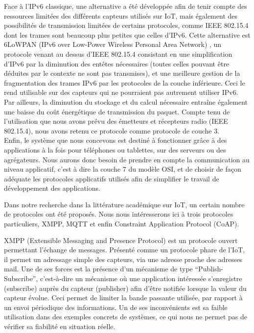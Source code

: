 \documentclass{article}
\begin{document}
Face à l’IPv6 classique, une alternative a été développée afin de tenir compte des ressources limitées des différents capteurs utilisés sur IoT, mais également des possibilités de transmission limitées de certains protocoles, comme IEEE 802.15.4 dont les trames sont beaucoup plus petites que celles d’IPv6. Cette alternative est 6LoWPAN (IPv6 over Low-Power Wireless Personal Area Network) \cite{6LoWPAN}, un protocole venant au dessus d’IEEE 802.15.4 consistant en une simplification d’IPv6 par la diminution des entêtes nécessaires (toutes celles pouvant être déduites par le contexte ne sont pas transmises), et une meilleure gestion de la fragmentation des trames IPv6 par les protocoles de la couche inférieure. Ceci le rend utilisable sur des capteurs qui ne pourraient pas autrement utiliser IPv6. Par ailleurs, la diminution du stockage et du calcul nécessaire entraîne également une baisse du coût énergétique de transmission du paquet. Compte tenu de l’utilisation que nous avons prévu des émetteurs et récepteurs radio (IEEE 802.15.4), nous avons retenu ce protocole comme protocole de couche 3.
\\

Enfin, le système que nous concevons est destiné à fonctionner grâce à des applications à la fois pour téléphones ou tablettes, sur des serveurs ou des agrégateurs. Nous aurons donc besoin de prendre en compte la communication au niveau applicatif, c’est à dire la couche 7 du modèle OSI, et de choisir de façon adéquate les protocoles applicatifs utilisés afin de simplifier le travail de développement des applications.

Dans notre recherche dans la littérature académique sur IoT, un certain nombre de protocoles ont été proposés. Nous nous intéresserons ici à trois protocoles particuliers, XMPP, MQTT et enfin Constraint Application Protocol (CoAP).

XMPP (Extensible Messaging and Presence Protocol) \cite{kirsche2012unify} est un protocole ouvert permettant l’échange de messages. Présenté comme un protocole phare de l’IoT, il permet un adressage simple des capteurs, via une adresse proche des adresses mail. Une de ses forces est la présence d’un mécanisme de type “Publish-Subscribe”, c’est-à-dire un mécanisme où une application intéressée s’enregistre (subscribe) auprès du capteur (publisher) afin d’être notifiée lorsque la valeur du capteur évolue. Ceci permet de limiter la bande passante utilisée, par rapport à un envoi périodique des informations. Un de ses inconvénients est sa faible utilisation dans des exemples concrets de systèmes, ce qui nous ne permet pas de vérifier sa fiabilité en situation réelle.
\end{document}

